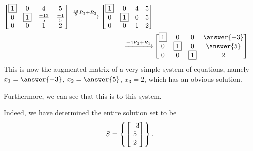 \documentclass{ximera}
\begin{document}
\begin{example}
\begin{align*}
\begin{bmatrix}
\leading{1}&0&4&5\\
0&\leading{1}&\frac{-13}{5}&\frac{-1}{5}\\
0&0&1&2
\end{bmatrix}
\xrightarrow{\rowopadd{\frac{13}{5}}{3}{2}}
\begin{bmatrix}
\leading{1}&0&4&5\\
0&\leading{1}&0&5\\
0&0&1&2
\end{bmatrix}\\
\xrightarrow{\rowopadd{-4}{3}{1}}
&
\begin{bmatrix}
\leading{1}&0&0&\answer{-3}\\
0&\leading{1}&0&\answer{5}\\
0&0&\leading{1}&2
\end{bmatrix}
\end{align*}
This is now the augmented matrix of a very simple system of equations, namely $x_1=\answer{-3}$, $x_2=\answer{5}$, $x_3=2$, which has an obvious solution.  

\begin{question}
  Furthermore, we can see that this is  to this system.
  \begin{feedback}
    Indeed, we have determined the entire solution set to be
    \[
      S=\left\{\begin{bmatrix}-3\\5\\2\end{bmatrix}\right\}.
    \]
  \end{feedback}
\end{question}
\end{example}
\end{document}
